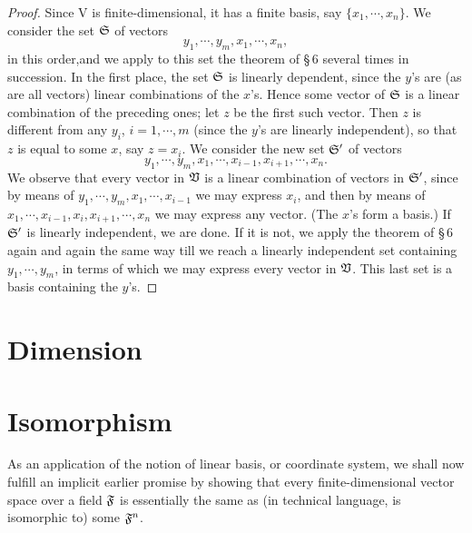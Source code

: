 \begin{proof}
    Since V is finite-dimensional, it has a finite basis, say \(\{x_1, \cdots, x_n\}\). We consider the set \(\frak{S}\) of vectors
    \begin{equation*}
        y_1, \cdots, y_m, x_1, \cdots, x_n,
    \end{equation*}
    in this order,and we apply to this set the theorem of \S\,6 several times in
    succession. In the first place, the set \(\frak{S}\) is linearly dependent,
    since the \(y\)'s are (as are all vectors) linear combinations of the
    \(x\)'s. Hence some vector of \(\frak{S}\) is a linear combination of the
    preceding ones; let \(z\) be the first such vector. Then \(z\) is different
    from any \(y_i\), \(i = 1, \cdots, m\) (since the \(y\)'s are linearly
    independent), so that \(z\) is equal to some \(x\), say \(z = x_i\). We
    consider the new set \(\frak{S}'\) of vectors
    \begin{equation*}
        y_1, \cdots, y_m, x_1, \cdots, x_{i-1}, x_{i+1}, \cdots, x_n.
    \end{equation*}
    We observe that every vector in \(\frak{V}\) is a linear combination of
    vectors in \(\frak{S}'\), since by means of \(y_1, \cdots, y_m, x_1, \cdots,
    x_{i-1}\) we may express \(x_i\), and then by means of \(x_1, \cdots,
    x_{i-1}, x_i, x_{i+1}, \cdots, x_n\) we may express any vector. (The \(x\)'s
    form a basis.) If \(\frak{S}'\) is linearly independent, we are done. If it
    is not, we apply the theorem of \S\,6 again and again the same way till we
    reach a linearly independent set containing \(y_1, \cdots, y_m\), in terms
    of which we may express every vector in \(\frak{V}\). This last set is a basis
    containing the \(y\)'s.
\end{proof}


\section{Dimension}

\section{Isomorphism}

As an application of the notion of linear basis, or coordinate system, we shall now fulfill an implicit earlier promise by showing that every finite-dimensional vector space over a field \(\frak{F}\) is essentially the same as (in technical language, is isomorphic to) some \(\frak{F}^n\).

